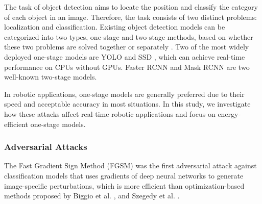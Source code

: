 The task of object detection aims to locate the position and classify the category of each object in an image. Therefore, the task consists of two distinct problems: localization and classification. Existing object detection models can be categorized into two types, one-stage and two-stage methods, based on whether these two problems are solved together or separately \cite{Zhao2019}. Two of the most widely deployed one-stage models are YOLO \cite{redmon2016you, redmon2018yolov3, bochkovskiy2020yolov4} and SSD \cite{liu2016ssd}, which can achieve real-time performance on CPUs without GPUs. Faster RCNN \cite{ren2015faster} and Mask RCNN \cite{he2017mask} are two well-known two-stage models. 



In robotic applications, one-stage models are generally preferred due to their speed and acceptable accuracy in most situations. In this study, we investigate how these attacks affect real-time robotic applications and focus on energy-efficient one-stage models.



\subsubsection{Adversarial Attacks}

 The Fast Gradient Sign Method (FGSM) \cite{GoodfellowSS14} was the first adversarial attack against classification models that uses gradients of deep neural networks to generate image-specific perturbations, which is more efficient than optimization-based methods proposed by Biggio et al. \cite{biggio2013evasion}, and Szegedy et al. \cite{szegedy2013intriguing}. 

